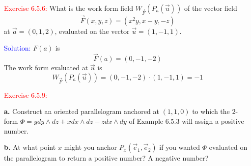 \documentclass[12pt]{article}
\begin{document}
\textcolor{red}{Exercise 6.5.6:}
What is the work form field $W_{\vec F}(P_{a}(\vec u))$ of the vector field
$$
\vec F(x,y,z) = (x^2y,x-y,-z)
$$
at $\vec a = (0,1,2)$, evaluated on the vector $\vec u = (1,-1,1)$.


\bigskip

\textcolor{blue}{Solution:}
    $F(a)$ is
    \[
        \vec F(a) = (0, -1, -2)
    \]
    The work form evaluated at $\vec u$ is
    \[
        W_{\vec F}(P_{a}(\vec u)) = 
        (0, -1, -2) \cdot (1, -1, 1) =
        -1
    \]
\newpage














\textcolor{red}{Exercise 6.5.9:}


\textbf{a.} Construct an oriented parallelogram anchored at $(1,1,0)$ to which  the $2$-form $\Phi = ydy\wedge dz+ xdx\wedge dz-zdx\wedge dy$ of Example 6.5.3 will assign a positive number.


\textbf{b.} At what point $x$ might you anchor $P_x(\vec e_1,\vec e_2)$ if you wanted $\Phi$ evaluated on the parallelogram to return  a positive number? A negative number?


\bigskip
\end{document}
